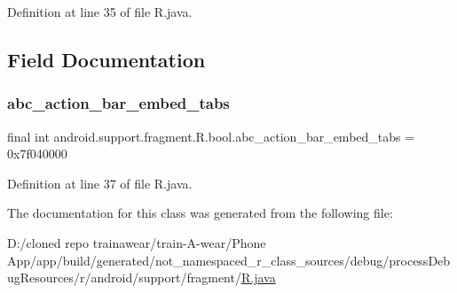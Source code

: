 Definition at line 35 of file R.\+java.


\begin{DoxyCode}{0}

\end{DoxyCode}


\subsection{Field Documentation}
\mbox{\label{classandroid_1_1support_1_1fragment_1_1_r_1_1bool_aade12b7432258093b82bae701731c7f7}} 
\subsubsection{\texorpdfstring{abc\_action\_bar\_embed\_tabs}{abc\_action\_bar\_embed\_tabs}}
{\footnotesize\ttfamily final int android.\+support.\+fragment.\+R.\+bool.\+abc\+\_\+action\+\_\+bar\+\_\+embed\+\_\+tabs = 0x7f040000\hspace{0.3cm}{\ttfamily [static]}}



Definition at line 37 of file R.\+java.



The documentation for this class was generated from the following file\+:\begin{DoxyCompactItemize}
\item 
D\+:/cloned repo trainawear/train-\/\+A-\/wear/\+Phone App/app/build/generated/not\+\_\+namespaced\+\_\+r\+\_\+class\+\_\+sources/debug/process\+Debug\+Resources/r/android/support/fragment/\mbox{\hyperlink{process_debug_resources_2r_2android_2support_2fragment_2_r_8java}{R.\+java}}\end{DoxyCompactItemize}
